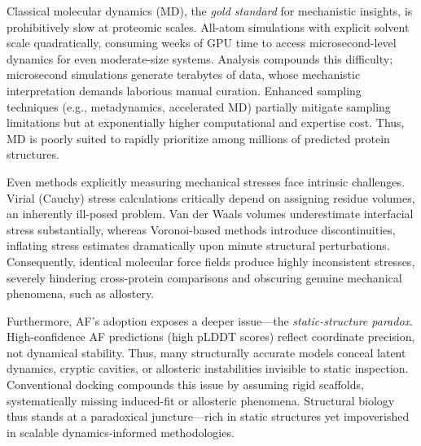 \documentclass[pdflatex,sn-mathphys-num]{sn-jnl}
\begin{document}
Classical molecular dynamics (MD), the \emph{gold standard} for mechanistic insights\cite{Shaw2010,Hollingsworth2018}, is prohibitively slow at proteomic scales. All-atom simulations with explicit solvent scale quadratically, consuming weeks of GPU time to access microsecond-level dynamics for even moderate-size systems\cite{Lane2013}. Analysis compounds this difficulty; microsecond simulations generate terabytes of data, whose mechanistic interpretation demands laborious manual curation\cite{Husic2018,Bowman2012}. Enhanced sampling techniques (e.g., metadynamics, accelerated MD) partially mitigate sampling limitations but at exponentially higher computational and expertise cost\cite{Freddolino2010,Patriksson2008,Laio2008,Limongelli2013}. Thus, MD is poorly suited to rapidly prioritize among millions of predicted protein structures.

Even methods explicitly measuring mechanical stresses face intrinsic challenges. Virial (Cauchy) stress calculations critically depend on assigning residue volumes, an inherently ill-posed problem\cite{Zhou2008,Admal2010}. Van der Waals volumes underestimate interfacial stress substantially, whereas Voronoi-based methods introduce discontinuities, inflating stress estimates dramatically upon minute structural perturbations\cite{Admal2010}. Consequently, identical molecular force fields produce highly inconsistent stresses, severely hindering cross-protein comparisons and obscuring genuine mechanical phenomena, such as allostery\cite{Zhou2008}.

Furthermore, AF's adoption exposes a deeper issue—the \emph{static-structure paradox}. High-confidence AF predictions (high pLDDT scores) reflect coordinate precision, not dynamical stability\cite{Pak2023,Buel2023}. Thus, many structurally accurate models conceal latent dynamics, cryptic cavities, or allosteric instabilities invisible to static inspection\cite{Vajda2018,Cimermancic2016,Meller2023}. Conventional docking compounds this issue by assuming rigid scaffolds, systematically missing induced-fit or allosteric phenomena\cite{Trott2010,Nussinov2019}. Structural biology thus stands at a paradoxical juncture—rich in static structures yet impoverished in scalable dynamics-informed methodologies\cite{Alderson2023,Wayment2022}.
\end{document}
